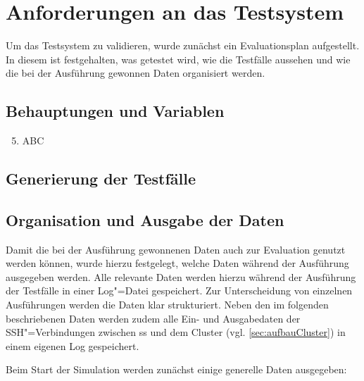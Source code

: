 \section{Anforderungen an das Testsystem}
\label{sec:evaluationPlan}

Um das Testsystem zu validieren, wurde zunächst ein Evaluationsplan aufgestellt.
In diesem ist festgehalten, was getestet wird, wie die Testfälle aussehen und wie die bei der Ausführung gewonnen Daten organisiert werden.

\subsection{Behauptungen und Variablen}
\label{sec:predictions}

\begin{enumerate}
    \setcounter{enumi}{4}
    \item ABC
\end{enumerate}


\subsection{Generierung der Testfälle}
\label{sec:testcaseGeneration}



\subsection{Organisation und Ausgabe der Daten}
\label{sec:dataOrganisation}

Damit die bei der Ausführung gewonnenen Daten auch zur Evaluation genutzt werden können, wurde hierzu festgelegt, welche Daten während der Ausführung ausgegeben werden.
Alle relevante Daten werden hierzu während der Ausführung der Testfälle in einer Log"=Datei gespeichert.
Zur Unterscheidung von einzelnen Ausführungen werden die Daten klar strukturiert.
Neben den im folgenden beschriebenen Daten werden zudem alle Ein- und Ausgabedaten der SSH"=Verbindungen zwischen \ac{ss} und dem Cluster (vgl. \autoref{sec:aufbauCluster}) in einem eigenen Log gespeichert.

Beim Start der Simulation werden zunächst einige generelle Daten ausgegeben:

